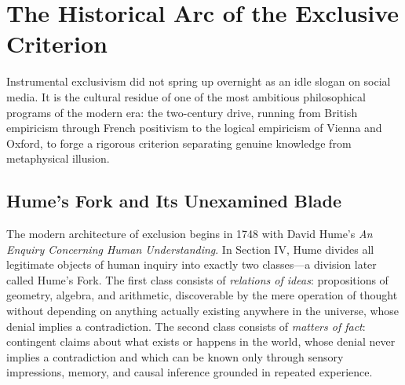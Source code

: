 \section{The Historical Arc of the Exclusive Criterion}

Instrumental exclusivism did not spring up overnight as an idle slogan on social media. It is the cultural residue of one of the most ambitious philosophical programs of the modern era: the two-century drive, running from British empiricism through French positivism to the logical empiricism of Vienna and Oxford, to forge a rigorous criterion separating genuine knowledge from metaphysical illusion.

\subsection{Hume's Fork and Its Unexamined Blade}

The modern architecture of exclusion begins in 1748 with David Hume's \emph{An Enquiry Concerning Human Understanding}. In Section IV, Hume divides all legitimate objects of human inquiry into exactly two classes---a division later called Hume's Fork. The first class consists of \emph{relations of ideas}: propositions of geometry, algebra, and arithmetic, discoverable by the mere operation of thought without depending on anything actually existing anywhere in the universe, whose denial implies a contradiction. The second class consists of \emph{matters of fact}: contingent claims about what exists or happens in the world, whose denial never implies a contradiction and which can be known only through sensory impressions, memory, and causal inference grounded in repeated experience.

